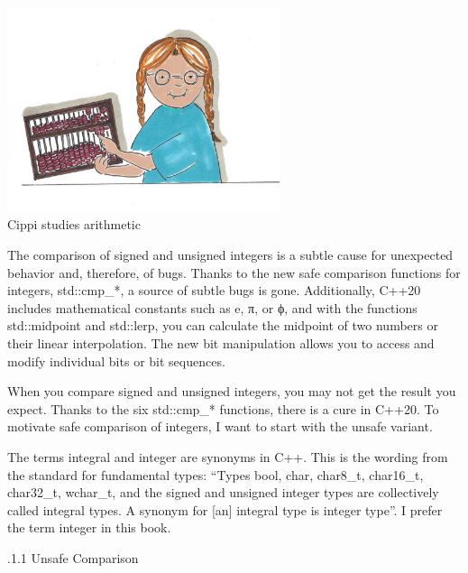\begin{center}
\includegraphics[width=0.6\textwidth]{content/3/chapter5/images/15.png}\\
Cippi studies arithmetic
\end{center}

The comparison of signed and unsigned integers is a subtle cause for unexpected behavior and, therefore, of bugs. Thanks to the new safe comparison functions for integers, std::cmp\_*, a source of subtle bugs is gone. Additionally, C++20 includes mathematical constants such as e, π, or ϕ, and with the functions std::midpoint and std::lerp, you can calculate the midpoint of two numbers or their linear interpolation. The new bit manipulation allows you to access and modify individual bits or bit sequences.


When you compare signed and unsigned integers, you may not get the result you expect. Thanks to the six std::cmp\_* functions, there is a cure in C++20. To motivate safe comparison of integers, I want to start with the unsafe variant.

\begin{tcolorbox}[colback=blue!5!white,colframe=blue!75!black,title={Integral versus Integer}]
	
The terms integral and integer are synonyms in C++. This is the wording from the standard for fundamental types: “Types bool, char, char8\_t, char16\_t, char32\_t, wchar\_t, and the signed and unsigned integer types are collectively called integral types. A synonym for [an] integral type is integer type”. I prefer the term integer in this book.
	
\end{tcolorbox}

.1.1\hspace{0.2cm} Unsafe Comparison

